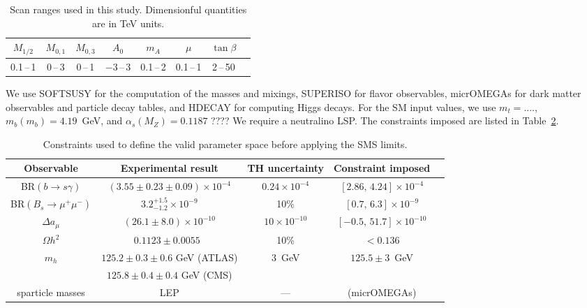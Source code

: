 \documentclass[12pt]{article}
\begin{document}
\begin{table}[t]\centering
\begin{tabular}{|c|c|c|c|c|c|c|c|}
  \hline
  $M_{1/2}$ & $M_{0,1}$ & $M_{0,3}$ & $A_0$ & $m_A$ & $\mu$ & $\tan\beta$ \\ 
  \hline
  0.1\,--\,1 & 0\,--\,3 & 0\,--\,1 & $-3$\,--\,3 & 0.1\,--\,2 & 0.1\,--\,1 & 2\,--\,50 \\
  \hline
\end{tabular}
\caption{Scan ranges used in this study. Dimensionful quantities are in TeV units.}
\label{tab:scan}
\end{table}

We use SOFTSUSY for the computation of the masses and mixings,  SUPERISO for flavor observables, 
micrOMEGAs for dark matter observables and particle decay tables, and HDECAY for computing Higgs decays.
For the SM input values, we use $m_t=....$, $m_b(m_b)=4.19$~GeV, and $\alpha_s(M_Z)=0.1187$ ????  
We require a neutralino LSP.  
The constraints imposed are listed in Table~\ref{tab:constraints}.

\begin{table}[t]\centering
\begin{tabular}{|c|c|c|c|c|}
\hline
  \bf Observable  & \bf Experimental result   & \bf TH uncertainty & \bf Constraint imposed \\
\hline
 BR$(b \rightarrow s\gamma) $ & $(3.55 \pm 0.23 \pm 0.09)\times 10^{-4}$ \cite{Amhis:2012bh} & $0.24 \times 10^{-4}$ & $[2.86,\,4.24] \times 10^{-4}$  \\
\hline
BR$(B_s \rightarrow \mu^+ \mu^-)$ & $3.2^{+1.5}_{-1.2} \times 10^{-9}$ \cite{lhcb:2012ct} & 10\% & $[0.7,\,6.3] \times 10^{-9}$\\
\hline
$\Delta a_\mu$ & $(26.1 \pm 8.0)\times 10^{-10}$ \cite{Hagiwara:2011af} & $10\times 10^{-10}$ & $[-0.5,\,51.7] \times 10^{-10}$ \\
\hline
$\Omega h^2$ & $0.1123\pm 0.0055$~\cite{} & 10\% & $<0.136$ \\
\hline
$m_h$ & $125.2\pm 0.3\pm 0.6$ GeV (ATLAS) & 3~GeV \cite{xxx} & $125.5\pm 3$~GeV \\
              & $125.8\pm 0.4\pm 0.4$ GeV (CMS)\phantom{00} & &  \\
\hline
 sparticle masses & LEP  & --- & (micrOMEGAs) \\
\hline
\end{tabular}
\caption{Constraints used to define the valid parameter space before applying the SMS limits.}
\label{tab:constraints}
\end{table}
\end{document}
